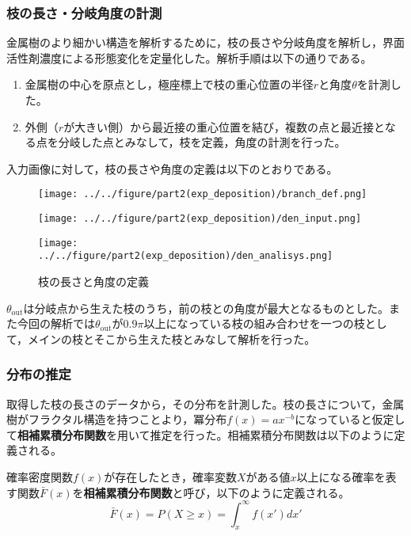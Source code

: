 \documentclass[autodetect-engine,dvi=dvipdfmx,a4paper,ja=standard,oneside,openany,11pt,draft]{bxjsbook}
\begin{document}
\subsubsection{枝の長さ・分岐角度の計測}
金属樹のより細かい構造を解析するために，枝の長さや分岐角度を解析し，界面活性剤濃度による形態変化を定量化した。解析手順は以下の通りである。
\begin{enumerate}
  \item 金属樹の中心を原点とし，極座標上で枝の重心位置の半径$r$と角度$\theta$を計測した。
  \item 外側（$r$が大きい側）から最近接の重心位置を結び，複数の点と最近接となる点を分岐した点とみなして，枝を定義，角度の計測を行った。
\end{enumerate}
入力画像に対して，枝の長さや角度の定義は以下のとおりである。
\begin{figure}
  \begin{minipage}
    {0.32\textwidth}
    \centering
    \texttt{[image: ../../figure/part2(exp\_deposition)/branch\_def.png]}
    \label{fig:branch_def}
  \end{minipage}
  \begin{minipage}
    {0.32\textwidth}
    \centering
    \texttt{[image: ../../figure/part2(exp\_deposition)/den\_input.png]}
    \label{fig:den_input}
  \end{minipage}
  \begin{minipage}
    {0.32\textwidth}
    \centering
    \texttt{[image: ../../figure/part2(exp\_deposition)/den\_analisys.png]}
    \label{fig:den_analisys}
  \end{minipage}
  \caption{枝の長さと角度の定義}
\end{figure}
$\theta_{\mathrm{out}}$は分岐点から生えた枝のうち，前の枝との角度が最大となるものとした。また今回の解析では$\theta_{\mathrm{out}}$が$0.9\pi$以上になっている枝の組み合わせを一つの枝として，メインの枝とそこから生えた枝とみなして解析を行った。
\subsubsection{分布の推定}
取得した枝の長さのデータから，その分布を計測した。枝の長さについて，金属樹がフラクタル構造を持つことより，冪分布$f(x)=ax^{-b}$になっていると仮定して\textbf{相補累積分布関数}を用いて推定を行った。相補累積分布関数は以下のように定義される。
\begin{defi}
  確率密度関数$f(x)$が存在したとき，確率変数$X$がある値$x$以上になる確率を表す関数$\bar{F}(x)$を\textbf{相補累積分布関数}と呼び，以下のように定義される。
  \begin{equation}
    \bar{F}(x) = P(X \geq x) = \int_{x}^{\infty} f(x')dx'
  \end{equation}
\end{defi}
\end{document}
